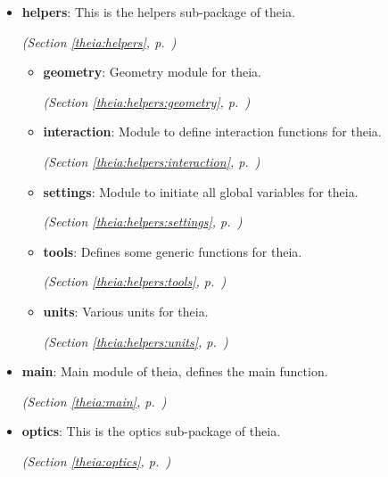 \begin{itemize}
\setlength{\parskip}{0ex}
\item \textbf{helpers}: This is the helpers sub-package of theia.



  \textit{(Section \ref{theia:helpers}, p.~\pageref{theia:helpers})}

  \begin{itemize}
\setlength{\parskip}{0ex}
    \item \textbf{geometry}: Geometry module for theia.



  \textit{(Section \ref{theia:helpers:geometry}, p.~\pageref{theia:helpers:geometry})}

    \item \textbf{interaction}: Module to define interaction functions for theia.



  \textit{(Section \ref{theia:helpers:interaction}, p.~\pageref{theia:helpers:interaction})}

    \item \textbf{settings}: Module to initiate all global variables for theia.



  \textit{(Section \ref{theia:helpers:settings}, p.~\pageref{theia:helpers:settings})}

    \item \textbf{tools}: Defines some generic functions for theia.



  \textit{(Section \ref{theia:helpers:tools}, p.~\pageref{theia:helpers:tools})}

    \item \textbf{units}: Various units for theia.



  \textit{(Section \ref{theia:helpers:units}, p.~\pageref{theia:helpers:units})}

  \end{itemize}
\item \textbf{main}: Main module of theia, defines the main function.



  \textit{(Section \ref{theia:main}, p.~\pageref{theia:main})}

\item \textbf{optics}: This is the optics sub-package of theia.



  \textit{(Section \ref{theia:optics}, p.~\pageref{theia:optics})}


\end{itemize}
